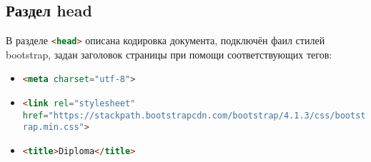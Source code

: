 \subsection{Раздел head}
В разделе \lstinline[language=HTML]{<head>} описана кодировка документа, подключён фаил стилей bootstrap, задан заголовок страницы при помощи соответствующих тегов:
\begin{itemize}
	\item \lstinline[language=HTML]{<meta charset="utf-8">}
	\item \lstinline[language=HTML]{<link rel="stylesheet" href="https://stackpath.bootstrapcdn.com/bootstrap/4.1.3/css/bootstrap.min.css">}
	\item \lstinline[language=HTML]{<title>Diploma</title>}
\end{itemize}